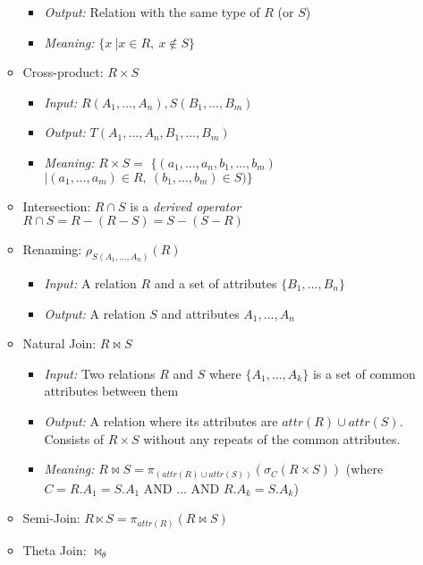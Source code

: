 \documentclass[landscape,8pt]{extarticle}
\begin{document}
\begin{multicols}{4}
\begin{itemize}
\begin{itemize}
\begin{itemize}
                \item \emph{Output:} Relation with the same type of $R$ (or $S$)
                \item \emph{Meaning:} $\{x\ | x \in R,\ x \notin S\}$
            \end{itemize}
            \item Cross-product: $R \times S$
            \begin{itemize}
                \item \emph{Input:} $R(A_1, \dots, A_n), S(B_1, \dots, B_m)$
                \item \emph{Output:} $T(A_1, \dots, A_n, B_1, \dots, B_m)$
                \item \emph{Meaning:} $R \times S =$ $ \{(a_1, \dots, a_n, b_1, \dots, b_m) $ $| (a_1,
                \dots, a_m) \in R,\ (b_1, \dots, b_m) \in S) \}$
            \end{itemize}
            \item Intersection: $R \cap S$ is a \emph{derived operator} \\
            $R \cap S = R - (R - S) = S - (S - R)$
        \item Renaming: $\rho_{S(A_1, \dots, A_n)}(R)$
        \begin{itemize}
            \item \emph{Input:} A relation $R$ and a set of attributes $\{B_1, \dots, B_n\}$
            \item \emph{Output:} A relation $S$ and attributes $A_1, \dots, A_n$
        \end{itemize}
        \item Natural Join: $R \bowtie S$
        \begin{itemize}
            \item \emph{Input:} Two relations $R$ and $S$ where $\{A_1, \dots, A_k\}$ is a set of
            common attributes between them
            \item \emph{Output:} A relation where its attributes are $attr(R) \cup attr(S)$.
            Consists of $R \times S$ without any repeats of the common attributes.
            \item \emph{Meaning:} $R \bowtie S = \pi_{(attr(R) \cup attr(S))} (\sigma_{C} (R \times
            S))$ (where $C = R.A_1 = S.A_1 \text{ AND } \dots \text{ AND } R.A_k = S.A_k$)
        \end{itemize}
        \item Semi-Join: $R \ltimes S = \pi_{attr(R)}(R \bowtie S)$
        \item Theta Join: $\bowtie_\theta$

\end{itemize}
\end{itemize}
\end{multicols}
\end{document}

